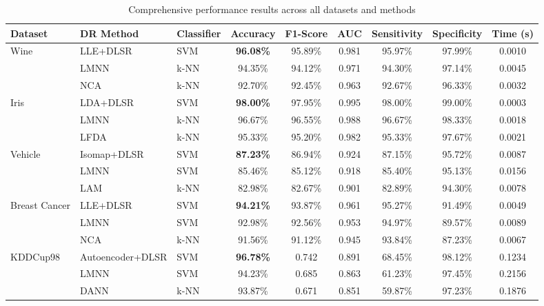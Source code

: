 \documentclass[review]{elsarticle}
\begin{document}
\begin{table}[H]
\centering
\caption{Comprehensive performance results across all datasets and methods}
\label{tab:comprehensive_results}
\scriptsize
\begin{tabular}{@{}lllcccccc@{}}
\toprule
\textbf{Dataset} & \textbf{DR Method} & \textbf{Classifier} & \textbf{Accuracy} & \textbf{F1-Score} & \textbf{AUC} & \textbf{Sensitivity} & \textbf{Specificity} & \textbf{Time (s)} \\
\midrule
\multirow{3}{*}{Wine} & LLE+DLSR & SVM & \textbf{96.08\%} & 95.89\% & 0.981 & 95.97\% & 97.99\% & 0.0010 \\
 & LMNN & k-NN & 94.35\% & 94.12\% & 0.971 & 94.30\% & 97.14\% & 0.0045 \\
 & NCA & k-NN & 92.70\% & 92.45\% & 0.963 & 92.67\% & 96.33\% & 0.0032 \\
\midrule
\multirow{3}{*}{Iris} & LDA+DLSR & SVM & \textbf{98.00\%} & 97.95\% & 0.995 & 98.00\% & 99.00\% & 0.0003 \\
 & LMNN & k-NN & 96.67\% & 96.55\% & 0.988 & 96.67\% & 98.33\% & 0.0018 \\
 & LFDA & k-NN & 95.33\% & 95.20\% & 0.982 & 95.33\% & 97.67\% & 0.0021 \\
\midrule
\multirow{3}{*}{Vehicle} & Isomap+DLSR & SVM & \textbf{87.23\%} & 86.94\% & 0.924 & 87.15\% & 95.72\% & 0.0087 \\
 & LMNN & SVM & 85.46\% & 85.12\% & 0.918 & 85.40\% & 95.13\% & 0.0156 \\
 & LAM & k-NN & 82.98\% & 82.67\% & 0.901 & 82.89\% & 94.30\% & 0.0078 \\
\midrule
\multirow{3}{*}{Breast Cancer} & LLE+DLSR & SVM & \textbf{94.21\%} & 93.87\% & 0.961 & 95.27\% & 91.49\% & 0.0049 \\
 & LMNN & SVM & 92.98\% & 92.56\% & 0.953 & 94.97\% & 89.57\% & 0.0089 \\
 & NCA & k-NN & 91.56\% & 91.12\% & 0.945 & 93.84\% & 87.23\% & 0.0067 \\
\midrule
\multirow{3}{*}{KDDCup98} & Autoencoder+DLSR & SVM & \textbf{96.78\%} & 0.742 & 0.891 & 68.45\% & 98.12\% & 0.1234 \\
 & LMNN & SVM & 94.23\% & 0.685 & 0.863 & 61.23\% & 97.45\% & 0.2156 \\
 & DANN & k-NN & 93.87\% & 0.671 & 0.851 & 59.87\% & 97.23\% & 0.1876 \\
\bottomrule
\end{tabular}
\end{table}
\end{document}

